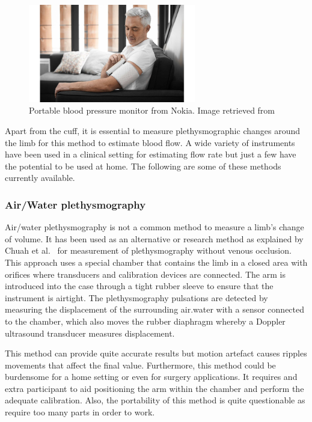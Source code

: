 \begin{figure}[!htpb]
	\centering
	\includegraphics[width=0.65\textwidth,keepaspectratio]{nokiabpm}    
	\caption[Nokia BPM+]{Portable blood pressure monitor from Nokia. Image retrieved from \cite{nokiabpm}}
	\label{fig:nokiabpm}
\end{figure}
 
Apart from the cuff, it is essential to measure plethysmographic changes around the limb for this method to estimate blood flow. A wide variety of instruments have been used in a clinical setting for estimating flow rate but just a few have the potential to be used at home. The following are some of these methods currently available.  

\subsubsection{Air/Water plethysmography}
\label{section literature air plethysmography}
Air/water plethysmography is not a common method to measure a limb’s change of volume. It has been used as an alternative or research method as explained by Chuah et al.~\cite{chuah2004plethysmography} for measurement of plethysmography without venous occlusion. This approach uses a special chamber that contains the limb in a closed area with orifices where transducers and calibration devices are connected. The arm is introduced into the case through a tight rubber sleeve to ensure that the instrument is airtight.  The plethysmography pulsations are detected by measuring the displacement of the surrounding air.water with a sensor connected to the chamber, which also moves the rubber diaphragm whereby a Doppler ultrasound transducer measures displacement. 

This method can provide quite accurate results but motion artefact causes ripples movements that affect the final value. Furthermore, this method could be burdensome for a home setting or even for surgery applications. It requires and extra participant to aid positioning the arm within the chamber and perform the adequate calibration. Also, the portability of this method is quite questionable as require too many parts in order to work.

